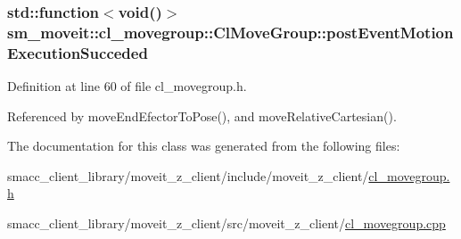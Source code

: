 \subsubsection[{\texorpdfstring{post\+Event\+Motion\+Execution\+Succeded}{postEventMotionExecutionSucceded}}]{\setlength{\rightskip}{0pt plus 5cm}std\+::function$<$void()$>$ sm\+\_\+moveit\+::cl\+\_\+movegroup\+::\+Cl\+Move\+Group\+::post\+Event\+Motion\+Execution\+Succeded\hspace{0.3cm}{\ttfamily [private]}}\hypertarget{classsm__moveit_1_1cl__movegroup_1_1ClMoveGroup_a1fde35aad5c4d3c0461d4b75553e6862}{}\label{classsm__moveit_1_1cl__movegroup_1_1ClMoveGroup_a1fde35aad5c4d3c0461d4b75553e6862}


Definition at line 60 of file cl\+\_\+movegroup.\+h.



Referenced by move\+End\+Efector\+To\+Pose(), and move\+Relative\+Cartesian().



The documentation for this class was generated from the following files\+:\begin{DoxyCompactItemize}
\item 
smacc\+\_\+client\+\_\+library/moveit\+\_\+z\+\_\+client/include/moveit\+\_\+z\+\_\+client/\hyperlink{cl__movegroup_8h}{cl\+\_\+movegroup.\+h}\item 
smacc\+\_\+client\+\_\+library/moveit\+\_\+z\+\_\+client/src/moveit\+\_\+z\+\_\+client/\hyperlink{cl__movegroup_8cpp}{cl\+\_\+movegroup.\+cpp}\end{DoxyCompactItemize}
